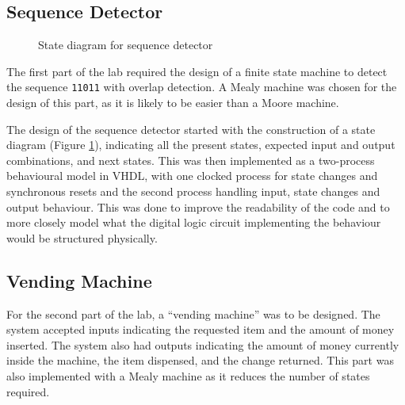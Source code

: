 \documentclass[12pt]{article}
\begin{document}
\subsection{Sequence Detector}
\begin{figure}[h]
  \centering
  \caption{State diagram for sequence detector}
  \label{fig:state-diagram}
\end{figure}

The first part of the lab required the design of a finite state machine to detect the sequence \verb|11011| with overlap detection. A Mealy machine was chosen for the design of this part, as it is likely to be easier than a Moore machine.

The design of the sequence detector started with the construction of a state diagram (Figure \ref{fig:state-diagram}), indicating all the present states, expected input and output combinations, and next states.
This was then implemented as a two-process behavioural model in VHDL, with one clocked process for state changes and synchronous resets and the second process handling input, state changes and output behaviour. This was done to improve the readability of the code and to more closely model what the digital logic circuit implementing the behaviour would be structured physically.

\subsection{Vending Machine}

For the second part of the lab, a ``vending machine'' was to be designed. The system accepted inputs indicating the requested item and the amount of money inserted. The system also had outputs indicating the amount of money currently inside the machine, the item dispensed, and the change returned. This part was also implemented with a Mealy machine as it reduces the number of states required.
\end{document}
